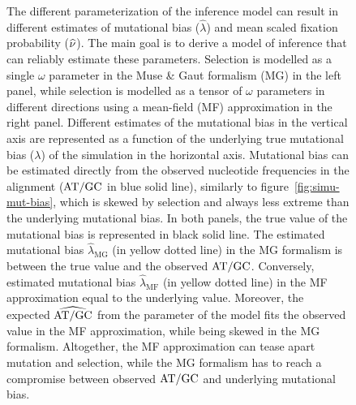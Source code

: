 \documentclass{article}
\begin{document}
\begin{figure}[!htb]
\begin{minipage}{0.49\linewidth}
    \end{minipage}
    \hfill
    \caption[Estimation of mutational bias]{
        The different parameterization of the inference model can result in different estimates of mutational bias ($\widehat{\lambda}$) and mean scaled fixation probability ($\widehat{\nu}$).
        The main goal is to derive a model of inference that can reliably estimate these parameters.
        Selection is modelled as a single $\omega$ parameter in the Muse \& Gaut formalism ({MG}) in the left panel, while selection is modelled as a tensor of $\omega$ parameters in different directions using a mean-field ({MF}) approximation in the right panel.
        Different estimates of the mutational bias in the vertical axis are represented as a function of the underlying true mutational bias ($\lambda$) of the simulation in the horizontal axis.
        Mutational bias can be estimated directly from the observed nucleotide frequencies in the alignment ($\text{AT/GC}$ in blue solid line), similarly to figure~\ref{fig:simu-mut-bias}, which is skewed by selection and always less extreme than the underlying mutational bias.
        In both panels, the true value of the mutational bias is represented in black solid line.
        The estimated mutational bias $\widehat{\lambda}_{\text{{MG}}}$ (in yellow dotted line) in the {MG} formalism is between the true value and the observed $\text{AT/GC}$.
        Conversely, estimated mutational bias $\widehat{\lambda}_{\text{{MF}}}$ (in yellow dotted line) in the {MF} approximation equal to the underlying value.
        Moreover, the expected $\widehat{\text{AT/GC}}$ from the parameter of the model fits the observed value in the {MF} approximation, while being skewed in the {MG} formalism.
        Altogether, the {MF} approximation can tease apart mutation and selection, while the {MG} formalism has to reach a compromise between observed $\text{AT/GC}$ and underlying mutational bias.
    }
    \label{fig:mut-bias-inference}
\end{figure}
\end{document}
